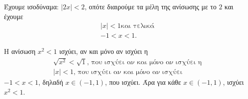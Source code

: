 
\begin{alist}
\item Έχουμε ισοδύναμα:
$|2x| < 2$, οπότε διαιρούμε τα μέλη της ανίσωσης με το $2$ και έχουμε
\begin{gather*}
|x| < 1\text{και τελικά} \\
-1 < x < 1.
\end{gather*}

\item Η ανίσωση
$x^2 < 1$ ισχύει, αν και μόνο αν ισχύει η
\begin{gather*}
\sqrt{x^2} < \sqrt{1}\text{, που ισχύει αν και μόνο αν ισχύει η} \\
|x| < 1\text{, που ισχύει αν και μόνο αν ισχύει}
\end{gather*}
$-1 < x < 1$, δηλαδή $x \in (-1, 1)$, που ισχύει.
Άρα για κάθε $x \in (-1, 1)$, ισχύει $x^2 < 1$.
\end{alist}

